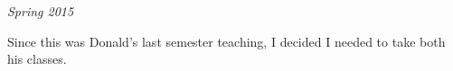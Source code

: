 \textit{Spring 2015}

Since this was Donald's last semester teaching, I decided I needed to take both
his classes.



\groupendnotes

